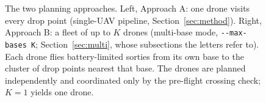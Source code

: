 \begin{figure}[t]
\caption{The two planning approaches. Left, Approach A: one drone visits every drop point (single-UAV pipeline, Section~\ref{sec:method}). Right, Approach B: a fleet of up to $K$ drones (multi-base mode, \texttt{-{}-max-bases K}; Section~\ref{sec:multi}, whose subsections the letters refer to). Each drone flies battery-limited sorties from its own base to the cluster of drop points nearest that base. The drones are planned independently and coordinated only by the pre-flight crossing check; $K=1$ yields one drone.}
\label{fig:modes}
\end{figure}
